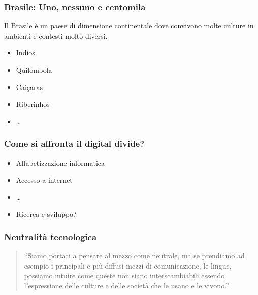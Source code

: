 \documentclass{beamer}
\begin{document}
{

\begin{frame}

  \frametitle{Brasile: Uno, nessuno e centomila}
  Il Brasile è un paese di dimensione continentale dove convivono
  molte culture in ambienti e contesti molto diversi. 
  \begin{itemize}
  \item Indios
  \item Quilombola
  \item Caiçaras
  \item Riberinhos
  \item \ldots
  \end{itemize}

\end{frame}

}

\begin{frame}

  \frametitle{Come si affronta il digital divide?}
  \begin{itemize}
    \item Alfabetizzazione informatica
    \item Accesso a internet
    \item \ldots
    \item Ricerca e sviluppo?
    \end{itemize}

 \end{frame}

\begin{frame}

  \frametitle{Neutralità tecnologica}

  \begin{quote}
    ``Siamo portati a pensare al mezzo come neutrale, ma se prendiamo
    ad esempio i principali e più diffusi mezzi di comunicazione, le
    lingue, possiamo intuire come queste non siano interscambiabili
    essendo l'espressione delle culture e delle società che le usano e
    le vivono.''
  \end{quote}
  
\end{frame}
\end{document}
